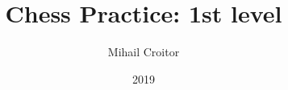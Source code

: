 \documentclass[a5paper]{book}
\title{Chess Practice: 1st level}
\author{Mihail Croitor}
\date{2019}
\begin{document}
\maketitle


\pagebreak


\smallbreak

\smallbreak

\smallbreak

\smallbreak

\smallbreak

\smallbreak

\smallbreak

\smallbreak


\pagebreak


\smallbreak

\smallbreak

\smallbreak

\smallbreak

\smallbreak


\pagebreak


\smallbreak

\smallbreak

\smallbreak

\smallbreak

\smallbreak

\smallbreak


\pagebreak


\smallbreak

\smallbreak


\pagebreak
{}
\fancyhead[RE,LO]{--}

\renewcommand{\labelenumi}{\bf{D.\arabic{enumi}}}
\begin{multicols}{2}



















\end{multicols}
\smallbreak
\begin{multicols}{2}


\end{multicols}
\end{document}
